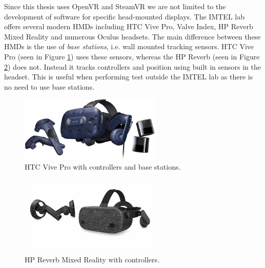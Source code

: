 Since this thesis uses OpenVR and SteamVR we are not limited to the development of software for specific head-mounted displays. The IMTEL lab offers several modern HMDs including HTC Vive Pro, Valve Index, HP Reverb Mixed Reality and numerous Oculus headsets. The main difference between these HMDs is the use of \textit{base stations}, i.e. wall mounted tracking sensors. HTC Vive Pro (seen in Figure \ref{fig:htcVivePro}) uses these sensors, whereas the HP Reverb (seen in Figure \ref{fig:hpReverb}) does not. Instead it tracks controllers and position using built in sensors in the headset. This is useful when performing test outside the IMTEL lab as there is no need to use base stations.   

\begin{figure}[!ht]
    \centering
    \includegraphics[width=0.6\textwidth]{./fig/background/htcVivePro.jpg}
    \caption{HTC Vive Pro with controllers and base stations.}
    \label{fig:htcVivePro}
\end{figure}

\begin{figure}[!ht]
    \centering
    \includegraphics[width=0.6\textwidth]{./fig/background/hpReverbPro.jpg}
    \caption{HP Reverb Mixed Reality with controllers.}
    \label{fig:hpReverb}
\end{figure}

\cleardoublepage